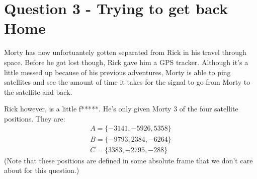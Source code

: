 \documentclass[a4paper, 12pt]{exam}
\begin{document}
	\pagebreak
	
	\section*{Question 3 - Trying to get back Home}
	Morty has now unfortuantely gotten separated from Rick in his travel through space. Before he got lost though, Rick gave him a GPS tracker. Although it's a little messed up because of his previous adventures, Morty is able to ping satellites and see the amount of time it takes for the signal to go from Morty to the satellite and back. 
	
	Rick however, is a little f*****. He's only given Morty 3 of the four satellite positions. They are:
	\begin{align*}
		A = \{-3141, -5926, 5358\}\\
		B = \{-9793, 2384, -6264\}\\
		C = \{3383, -2795, -288\}
	\end{align*}
	(Note that these positions are defined in some absolute frame that we don't care about for this question.)
\end{document}
